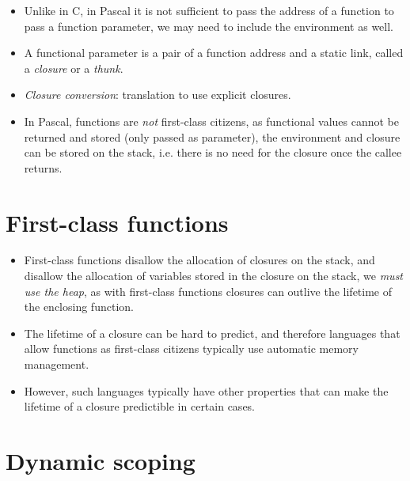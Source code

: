 \begin{itemize}

\item Unlike in C, in Pascal it is not sufficient to pass the address of a
function to pass a function parameter, we may need to include the environment
as well.

\item A functional parameter is a pair of a function address and a static link,
called a \emph{closure} or a \emph{thunk}.

\item \emph{Closure conversion}: translation to use explicit closures.

\item In Pascal, functions are \emph{not} first-class citizens, as functional
values cannot be returned and stored (only passed as parameter), the
environment and closure can be stored on the stack, i.e. there is no need for
the closure once the callee returns.

\end{itemize}

\section{First-class functions}

\begin{itemize}

\item First-class functions disallow the allocation of closures on the stack,
and disallow the allocation of variables stored in the closure on the stack, we
\emph{must use the heap}, as with first-class functions closures can outlive
the lifetime of the enclosing function.

\item The lifetime of a closure can be hard to predict, and therefore languages
that allow functions as first-class citizens typically use automatic memory
management.

\item However, such languages typically have other properties that can make the
lifetime of a closure predictible in certain cases.

\end{itemize}

\section{Dynamic scoping}

